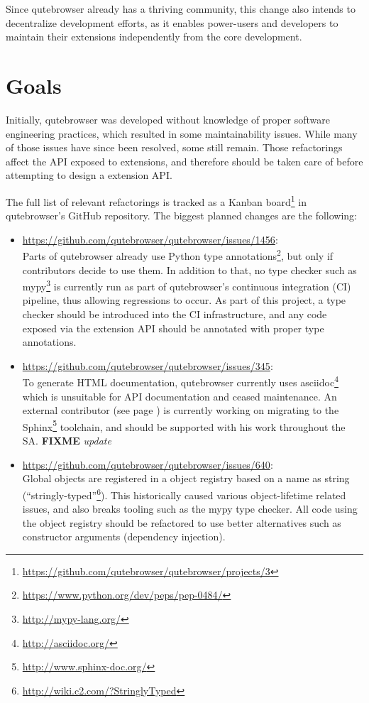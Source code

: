 \documentclass[a4paper,parskip=full]{scrreprt}
\newcommand{\fixme}[1]{\textbf{FIXME} \emph{#1}}
\begin{document}
Since qutebrowser already has a thriving community, this change also intends to
decentralize development efforts, as it enables power-users and
developers to maintain their extensions independently from the core development.

\section{Goals}
\label{goals}

Initially, qutebrowser was developed without knowledge of proper software
engineering practices, which resulted in some maintainability issues. While many
of those issues have since been resolved, some still remain. Those
refactorings affect the API exposed to extensions, and therefore should be taken
care of before attempting to design a extension API.

The full list of relevant refactorings is tracked as a Kanban
board\footnote{\url{https://github.com/qutebrowser/qutebrowser/projects/3}} in
qutebrowser's GitHub repository. The biggest planned changes are the following:

\begin{itemize}
  \item \url{https://github.com/qutebrowser/qutebrowser/issues/1456}: \\ Parts of qutebrowser already use Python type
    annotations\footnote{\url{https://www.python.org/dev/peps/pep-0484/}}, but
    only if contributors decide to use them. In addition to that, no type
    checker such as mypy\footnote{\url{http://mypy-lang.org/}} is currently run
    as part of qutebrowser's continuous integration (CI) pipeline, thus allowing
    regressions to occur. As part of this project, a type checker should be
    introduced into the CI infrastructure, and any code exposed via the extension
    API should be annotated with proper type annotations.
  \item \url{https://github.com/qutebrowser/qutebrowser/issues/345}: \\
    To generate HTML documentation, qutebrowser currently uses
    asciidoc\footnote{\url{http://asciidoc.org/}} which is unsuitable for API
    documentation and ceased maintenance. An external contributor (see page
    \pageref{fiete}) is currently working on migrating to the
    Sphinx\footnote{\url{http://www.sphinx-doc.org/}} toolchain, and should be
    supported with his work throughout the SA. \fixme{update}
  \item \url{https://github.com/qutebrowser/qutebrowser/issues/640}: \\
    Global objects are registered in a object registry based on a name as
    string (``stringly-typed''\footnote{\url{http://wiki.c2.com/?StringlyTyped}}).
    This historically caused various object-lifetime related issues, and also
breaks tooling such as the mypy type checker. All code using the object registry
should be refactored to use better alternatives such as constructor arguments
(dependency injection).
\end{itemize}
\end{document}
